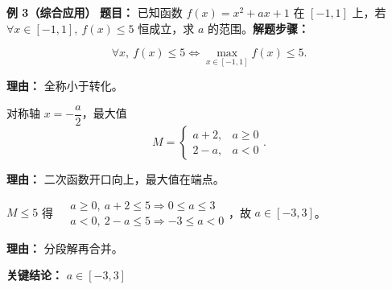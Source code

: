 \begin{examplebox}
	\medskip
	\textbf{\textcolor{CExample}{例 3（综合应用）}}
	\textbf{\textcolor{CExample}{题目：}} 已知函数 $f(x)=x^2+ax+1$ 在 $[-1,1]$ 上，若 $\forall x\in[-1,1],\ f(x)\leq 5$ 恒成立，求 $a$ 的范围。\textbf{\textcolor{CExample}{解题步骤：}}
	\begin{description}[style=nextline, leftmargin=2.8em, labelsep=0.5em, itemsep=0.45em]
		\item[\textbf{第一步（转化）：}]
			\[
				\forall x,\ f(x)\leq 5 \iff \max_{x\in[-1,1]}f(x)\leq 5.
			\]
			\par\textbf{理由：} 全称小于转化。
		\item[\textbf{第二步（求$M$）：}]
			对称轴 $x=-\dfrac{a}{2}$，最大值
			\[
				M=
				\begin{cases}
					a+2, & a\ge0\\ 2-a, & a<0
			\end{cases}
				.
			\]
			\par\textbf{理由：} 二次函数开口向上，最大值在端点。
		\item[\textbf{第三步（解不等式）：}]
			$M\leq5$ 得 $
			\begin{aligned}
				&a\ge0,\ a+2\leq5\Rightarrow 0\le a\le3\\ &a<0,\ 2-a\leq5\Rightarrow -3\le a<0
		\end{aligned}
			$，故 $a\in[-3,3]$。
			\par\textbf{理由：} 分段解再合并。
	\end{description}
	\textbf{\textcolor{CExample}{关键结论：}}
	\textbf{$a\in[-3,3]$}
\end{examplebox}
